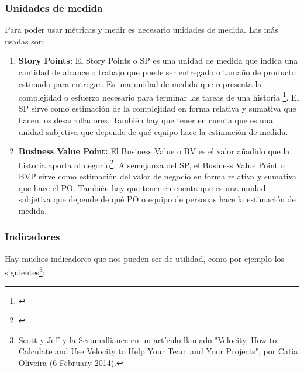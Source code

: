 \subsubsection{Unidades de medida}

Para poder usar métricas y medir es necesario unidades de medida. Las más usadas son:

\begin{enumerate}

\item {\textbf{Story Points:}
El Story Points o SP es una unidad de medida que indica una cantidad de alcance o trabajo que puede ser entregado o tamaño de producto estimado para entregar. Es una unidad de medida que representa la complejidad o esfuerzo necesario para terminar las tareas de una historia \footnote{\cite{Jipson-Thomas-2015}}. El SP sirve como estimación de la complejidad en forma relativa y sumativa que hacen los desarrolladores. También hay que tener en cuenta que es una unidad subjetiva que depende de qué equipo hace la estimación de medida.
}

\item {\textbf{Business Value Point:}
El Business Value o BV es el valor añadido que la historia aporta al negocio\footnote{\cite{Pointet-Botton-2012}}. A semejanza del SP, el Business Value Point o BVP sirve como estimación del valor de negocio en forma relativa y sumativa que hace el PO. También hay que tener en cuenta que es una unidad subjetiva que depende de qué PO o equipo de personas hace la estimación de medida.
}

\end{enumerate}

\subsubsection{Indicadores}

Hay muchos indicadores que nos pueden ser de utilidad, como por ejemplo los siguientes\footnote{Scott y Jeff \cite{Scott-Jeff-2013} y la  Scrumalliance en un artículo llamado "Velocity, How to Calculate and Use Velocity to Help Your Team and Your Projects", por Catia Oliveira (6 February 2014).}:

